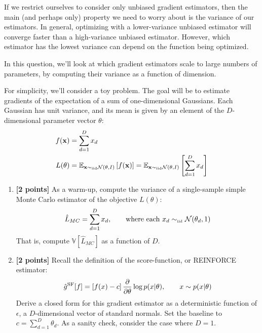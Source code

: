 \documentclass{harvardml}
\def\simiid{\sim_{\mbox{\tiny iid}}}
\newcommand{\bx}{\mathbf{x}}
\newcommand{\distNorm}{\mathcal{N}}
\newcommand{\var}{\mathbb{V}}
\newcommand{\E}{\mathbb{E}}
\newcommand{\PT}{\frac{\partial}{\partial \theta}}
\theoremstyle{plain}
\begin{document}









\begin{problem}

If we restrict ourselves to consider only unbiased gradient estimators, then the main (and perhaps only) property we need to worry about is the variance of our estimators.
In general, optimizing with a lower-variance unbiased estimator will converge faster than a high-variance unbiased estimator.
However, which estimator has the lowest variance can depend on the function being optimized.

In this question, we'll look at which gradient estimators scale to large numbers of parameters, by computing their variance as a function of dimension.

For simplicity, we'll consider a toy problem.
The goal will be to estimate gradients of the expectation of a sum of one-dimensional Gaussians.
Each Gaussian has unit variance, and its mean is given by an element of the $D$-dimensional parameter vector $\theta$:
%
\begin{align}
f(\bx) & = \sum_{d=1}^D x_d \\
L(\theta) & = \E_{\bx \simiid \distNorm(\theta, I)} \left[ f(\bx) \right]
= \E_{\bx \simiid \distNorm(\theta, I)} \left[ \sum_{d=1}^D x_d \right]
\end{align}



\begin{enumerate}[label=(\alph*)]
\item {\bf [2 points]} As a warm-up, compute the variance of a single-sample simple Monte Carlo estimator of the objective $L(\theta)$:
%
\begin{align}
\hat L_{MC} 
= \sum_{d=1}^D x_d, \qquad \textnormal{where each } x_d \simiid \distNorm(\theta_d, 1)
\end{align}
%
That is, compute $\var \left[ \hat L_{MC} \right]$ as a function of $D$.

\item {\bf [2 points]}
Recall the definition of the score-function, or REINFORCE estimator:
%
\begin{align}
\hat g^\textnormal{SF}[f] = \left[f(x) - c\right] \PT \log p(x | \theta), \qquad x \sim p(x | \theta)
\end{align}
%
Derive a closed form for this gradient estimator as a deterministic function of $\epsilon$, a $D$-dimensional vector of standard normals.
Set the baseline to $c = \sum_{d=1}^D \theta_d$.
As a sanity check, consider the case where $D = 1$.


\end{enumerate}
\end{problem}
\end{document}

